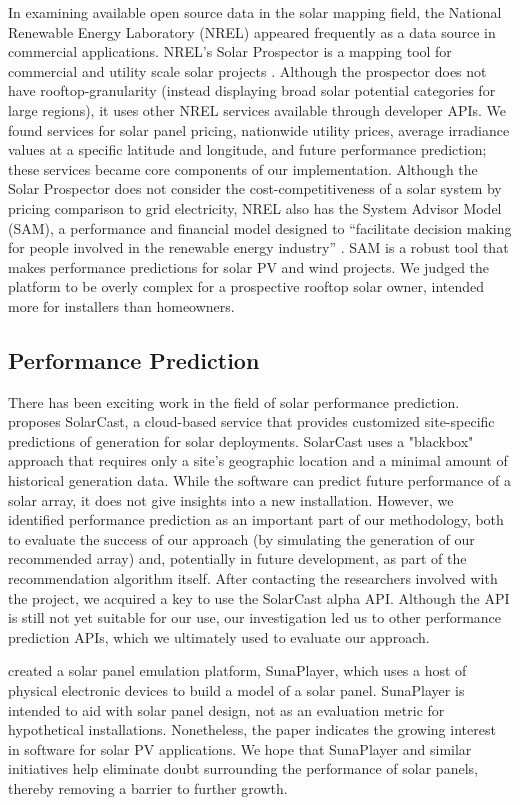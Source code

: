 \documentclass[pageno]{jpaper}
\begin{document}
In examining available open source data in the solar mapping field, the National Renewable Energy Laboratory (NREL) appeared frequently as a data source in commercial applications. NREL's Solar Prospector is a mapping tool for commercial and utility scale solar projects \cite{Prospector}. Although the prospector does not have rooftop-granularity (instead displaying broad solar potential categories for large regions), it uses other NREL services available through developer APIs. We found services for solar panel pricing, nationwide utility prices, average irradiance values at a specific latitude and longitude, and future performance prediction; these services became core components of our implementation. Although the Solar Prospector does not consider the cost-competitiveness of a solar system by pricing comparison to grid electricity, NREL also has the System Advisor Model (SAM), a performance and financial model designed to ``facilitate decision making for people involved in the renewable energy industry'' \cite{SAM}. SAM is a robust tool that makes performance predictions for solar PV and wind projects. We judged the platform to be overly complex for a prospective rooftop solar owner, intended more for installers than homeowners. 

\subsection{Performance Prediction}
There has been exciting work in the field of solar performance prediction. ~\cite{Iyengar:2014:SCB:2674061.2674071} proposes SolarCast, a cloud-based service that provides customized site-specific predictions of generation for solar deployments. SolarCast uses a "blackbox" approach that requires only a site's geographic location and a minimal amount of historical generation data. While the software can predict future performance of a solar array, it does not give insights into a new installation. However, we identified performance prediction as an important part of our methodology, both to evaluate the success of our approach (by simulating the generation of our recommended array) and, potentially in future development, as part of the recommendation algorithm itself. After contacting the researchers involved with the project, we acquired a key to use the SolarCast alpha API. Although the API is still not yet suitable for our use, our investigation led us to other performance prediction APIs, which we ultimately used to evaluate our approach.

\cite{Bobovych:2015:SHE:2737095.2737110} created a solar panel emulation platform, SunaPlayer, which uses a host of physical electronic devices to build a model of a solar panel. SunaPlayer is intended to aid with solar panel design, not as an evaluation metric for hypothetical installations. Nonetheless, the paper indicates the growing interest in software for solar PV applications. We hope that SunaPlayer and similar initiatives help eliminate doubt surrounding the performance of solar panels, thereby removing a barrier to further growth.
\end{document}
